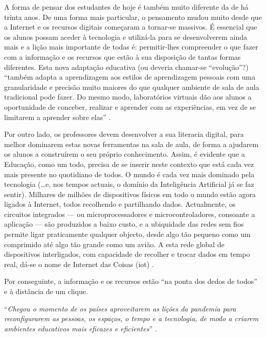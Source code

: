 A forma de pensar dos estudantes de hoje é também muito diferente da de há trinta anos. De uma forma mais particular, o pensamento mudou muito desde que a Internet e os recursos digitais começaram a tornar-se massivos. É essencial que os alunos possam aceder à tecnologia e utilizá-la para se desenvolverem ainda mais e a lição mais importante de todas é: permitir-lhes compreender o que fazer com a informação e os recursos que estão à sua disposição de tantas formas diferentes. Esta nova adaptação educativa (ou deveria chamar-se ``evolução''?) ``também adapta a aprendizagem aos estilos de aprendizagem pessoais com uma granularidade e precisão muito maiores do que qualquer ambiente de sala de aula tradicional pode fazer. Do mesmo modo, laboratórios virtuais dão aos alunos a oportunidade de conceber, realizar e aprender com as experiências, em vez de se limitarem a aprender sobre elas'' \cite{oecd_state_2021}.


Por outro lado, os professores devem desenvolver a sua literacia digital, para melhor dominarem estas novas ferramentas na sala de aula, de forma a ajudarem os alunos a construírem o seu próprio conhecimento. Assim, é evidente que a Educação, como um todo, precisa de se inserir neste contexto que está cada vez mais presente no quotidiano de todos. O mundo é cada vez mais dominado pela tecnologia (\ldots e, nos tempos actuais, o domínio da Inteligência Artificial já se faz sentir). Milhares de milhões de dispositivos físicos em todo o mundo estão agora ligados à Internet, todos recolhendo e partilhando dados. Actualmente, os circuitos integrados — ou microprocessadores e microcontroladores, consoante a aplicação — são produzidos a baixo custo, e a ubiquidade das redes sem fios permite ligar praticamente qualquer objecto, desde algo tão pequeno como um comprimido até algo tão grande como um avião. A esta rede global de dispositivos interligados, com capacidade de recolher e trocar dados em tempo real, dá-se o nome de Internet das Coisas (\acrfull{iot}) \cite{IoT}.

Por conseguinte, a informação e os recursos estão “na ponta dos dedos de todos” e à distância de um clique.

\begin{center}
    ``\textit{Chegou o momento de os países aproveitarem as lições da pandemia para reconfigurarem as pessoas, os espaços, o tempo e a tecnologia, de modo a criarem ambientes educativos mais eficazes e eficientes}'' \cite{thestateofeducation}.
\end{center}

